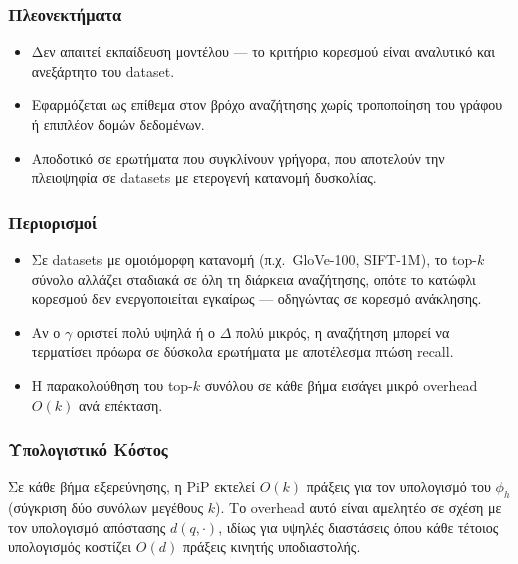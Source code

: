 \documentclass[12pt,a4paper]{article}
\begin{document}
\subsubsection*{Πλεονεκτήματα}
\begin{itemize}
    \item Δεν απαιτεί εκπαίδευση μοντέλου --- το κριτήριο κορεσμού είναι αναλυτικό και ανεξάρτητο του dataset.
    \item Εφαρμόζεται ως επίθεμα στον βρόχο αναζήτησης χωρίς τροποποίηση του γράφου ή επιπλέον δομών δεδομένων.
    \item Αποδοτικό σε ερωτήματα που συγκλίνουν γρήγορα, που αποτελούν την πλειοψηφία σε datasets με ετερογενή κατανομή δυσκολίας.
\end{itemize}

\subsubsection*{Περιορισμοί}
\begin{itemize}
    \item Σε datasets με ομοιόμορφη κατανομή (π.χ.\ GloVe-100, SIFT-1M), το top-$k$ σύνολο αλλάζει σταδιακά σε όλη τη διάρκεια αναζήτησης, οπότε το κατώφλι κορεσμού δεν ενεργοποιείται εγκαίρως --- οδηγώντας σε κορεσμό ανάκλησης.
    \item Αν ο $\gamma$ οριστεί πολύ υψηλά ή ο $\Delta$ πολύ μικρός, η αναζήτηση μπορεί να τερματίσει πρόωρα σε δύσκολα ερωτήματα με αποτέλεσμα πτώση recall.
    \item Η παρακολούθηση του top-$k$ συνόλου σε κάθε βήμα εισάγει μικρό overhead $O(k)$ ανά επέκταση.
\end{itemize}

\subsubsection*{Υπολογιστικό Κόστος}
Σε κάθε βήμα εξερεύνησης, η PiP εκτελεί $O(k)$ πράξεις για τον υπολογισμό του $\phi_h$ (σύγκριση δύο συνόλων μεγέθους $k$). Το overhead αυτό είναι αμελητέο σε σχέση με τον υπολογισμό απόστασης $d(q, \cdot)$, ιδίως για υψηλές διαστάσεις όπου κάθε τέτοιος υπολογισμός κοστίζει $O(d)$ πράξεις κινητής υποδιαστολής.
\end{document}
